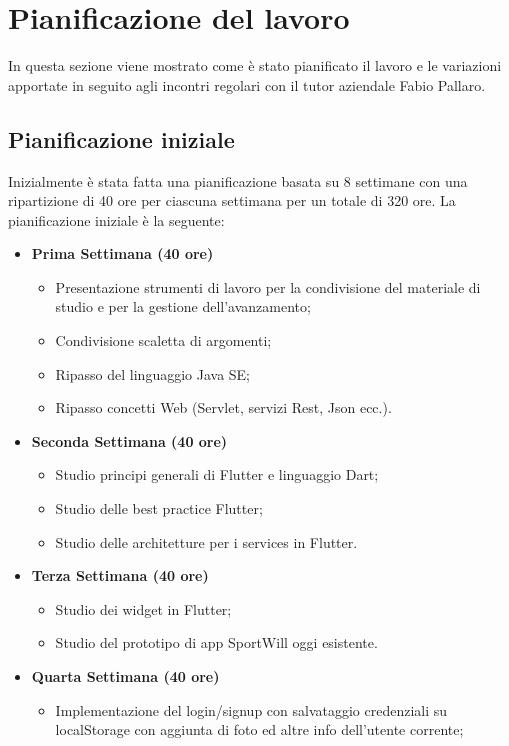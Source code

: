 \section{Pianificazione del lavoro}
In questa sezione viene mostrato come è stato pianificato il lavoro e le variazioni apportate in seguito agli incontri regolari con il tutor aziendale Fabio Pallaro.
\subsection{Pianificazione iniziale}
Inizialmente è stata fatta una pianificazione basata su 8 settimane con una ripartizione di 40 ore per ciascuna settimana per un totale di 320 ore.
La pianificazione iniziale è la seguente:
 \begin{itemize}
	\item \textbf{Prima Settimana (40 ore)}
	\begin{itemize}
		\item Presentazione strumenti di lavoro per la condivisione del materiale di studio e per la gestione
		dell’avanzamento;
		\item Condivisione scaletta di argomenti;
		\item Ripasso del linguaggio Java SE;
		\item Ripasso concetti Web (Servlet, servizi Rest, Json ecc.).
	\end{itemize}
	\item \textbf{Seconda Settimana (40 ore)} 
	\begin{itemize}
		\item Studio principi generali di Flutter e linguaggio Dart;
		\item Studio delle best practice Flutter;
		\item Studio delle architetture per i services in Flutter.
	\end{itemize}
	\item \textbf{Terza Settimana (40 ore)} 
	\begin{itemize}
		\item Studio dei widget in Flutter;
		\item Studio del prototipo di app SportWill oggi esistente.
	\end{itemize}
	\item \textbf{Quarta Settimana (40 ore)} 
	\begin{itemize}
		\item Implementazione del login/signup con salvataggio credenziali su localStorage con aggiunta di foto ed altre info dell'utente corrente;

\end{itemize}
\end{itemize}
